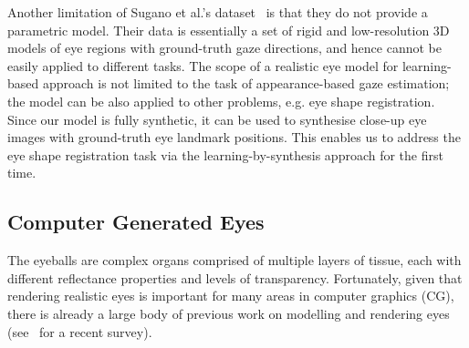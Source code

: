 Another limitation of Sugano et al.'s dataset~\cite{sugano2014learning} is that they do not provide a parametric model.
Their data is essentially a set of rigid and low-resolution 3D models of eye regions with ground-truth gaze directions, and hence cannot be easily applied to different tasks.
The scope of a realistic eye model for learning-based approach is not limited to the task of appearance-based gaze estimation; the model can be also applied to other problems, e.g. eye shape registration.
Since our model is fully synthetic, it can be used to synthesise close-up eye images with ground-truth eye landmark positions.
This enables us to address the eye shape registration task via the learning-by-synthesis approach for the first time.



\subsection{Computer Generated Eyes}


The eyeballs are complex organs comprised of multiple layers of tissue, each with different reflectance properties and levels of transparency.
Fortunately, given that rendering realistic eyes is important for many areas in computer graphics (CG), there is already a large body of previous work on modelling and rendering eyes (see~\cite{ruhland2014look} for a recent survey).


